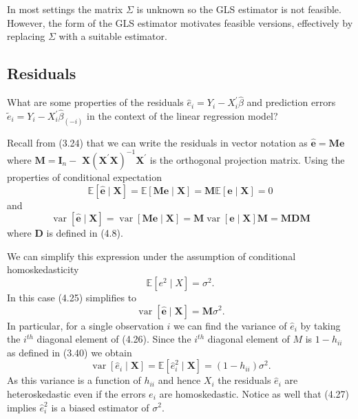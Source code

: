 \documentclass[10pt]{article}
\begin{document}
In most settings the matrix $\Sigma$ is unknown so the GLS estimator is not feasible. However, the form of the GLS estimator motivates feasible versions, effectively by replacing $\Sigma$ with a suitable estimator.

\subsection{Residuals}
What are some properties of the residuals $\widehat{e}_{i}=Y_{i}-X_{i}^{\prime} \widehat{\beta}$ and prediction errors $\widetilde{e}_{i}=Y_{i}-X_{i}^{\prime} \widehat{\beta}_{(-i)}$ in the context of the linear regression model?

Recall from (3.24) that we can write the residuals in vector notation as $\widehat{\boldsymbol{e}}=\boldsymbol{M} \boldsymbol{e}$ where $\boldsymbol{M}=\boldsymbol{I}_{n}-$ $\boldsymbol{X}\left(\boldsymbol{X}^{\prime} \boldsymbol{X}\right)^{-1} \boldsymbol{X}^{\prime}$ is the orthogonal projection matrix. Using the properties of conditional expectation
$$
\mathbb{E}[\widehat{\boldsymbol{e}} \mid \boldsymbol{X}]=\mathbb{E}[\boldsymbol{M e} \mid \boldsymbol{X}]=\boldsymbol{M} \mathbb{E}[\boldsymbol{e} \mid \boldsymbol{X}]=0
$$
and
$$
\operatorname{var}[\widehat{\boldsymbol{e}} \mid \boldsymbol{X}]=\operatorname{var}[\boldsymbol{M} \boldsymbol{e} \mid \boldsymbol{X}]=\boldsymbol{M} \operatorname{var}[\boldsymbol{e} \mid \boldsymbol{X}] \boldsymbol{M}=\boldsymbol{M D} \boldsymbol{M}
$$
where $\boldsymbol{D}$ is defined in (4.8).

We can simplify this expression under the assumption of conditional homoskedasticity
$$
\mathbb{E}\left[e^{2} \mid X\right]=\sigma^{2} .
$$
In this case (4.25) simplifies to
$$
\operatorname{var}[\widehat{\boldsymbol{e}} \mid \boldsymbol{X}]=\boldsymbol{M} \sigma^{2} .
$$
In particular, for a single observation $i$ we can find the variance of $\widehat{e}_{i}$ by taking the $i^{t h}$ diagonal element of (4.26). Since the $i^{t h}$ diagonal element of $M$ is $1-h_{i i}$ as defined in (3.40) we obtain
$$
\operatorname{var}\left[\widehat{e}_{i} \mid \boldsymbol{X}\right]=\mathbb{E}\left[\widehat{e}_{i}^{2} \mid \boldsymbol{X}\right]=\left(1-h_{i i}\right) \sigma^{2} .
$$
As this variance is a function of $h_{i i}$ and hence $X_{i}$ the residuals $\widehat{e}_{i}$ are heteroskedastic even if the errors $e_{i}$ are homoskedastic. Notice as well that (4.27) implies $\widehat{e}_{i}^{2}$ is a biased estimator of $\sigma^{2}$.
\end{document}
